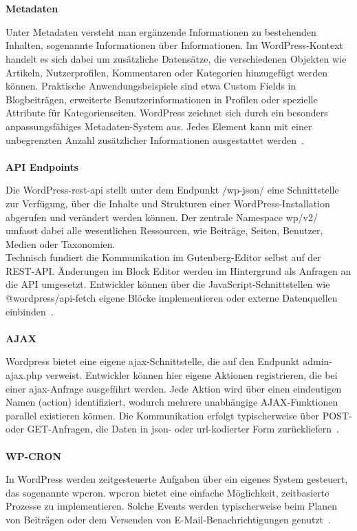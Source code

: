 \\
\\
\textbf{Metadaten}

Unter Metadaten versteht man ergänzende Informationen zu bestehenden Inhalten, sogenannte \grqq{}Informationen über Informationen\grqq{}.
Im WordPress-Kontext handelt es sich dabei um zusätzliche Datensätze, die verschiedenen Objekten wie Artikeln, Nutzerprofilen, Kommentaren oder Kategorien hinzugefügt werden können.
Praktische Anwendungsbeispiele sind etwa Custom Fields in Blogbeiträgen, erweiterte Benutzerinformationen in Profilen oder spezielle Attribute für Kategorienseiten.
WordPress zeichnet sich durch ein besonders anpassungsfähiges Metadaten-System aus.
Jedes Element kann mit einer unbegrenzten Anzahl zusätzlicher Informationen ausgestattet werden~\cite{wordpress2024metadata}.
\\
\\
\textbf{API Endpoints}

Die WordPress-\gls{rest}-\gls{api} stellt unter dem Endpunkt /wp-json/ eine Schnittstelle zur Verfügung, über die Inhalte und Strukturen einer WordPress-Installation abgerufen und verändert werden können.
Der zentrale Namespace wp/v2/ umfasst dabei alle wesentlichen Ressourcen, wie Beiträge, Seiten, Benutzer, Medien oder Taxonomien.
\\
Technisch fundiert die Kommunikation im Gutenberg-Editor selbst auf der REST-API.
Änderungen im Block Editor werden im Hintergrund als Anfragen an die API umgesetzt.
Entwickler können über die JavaScript-Schnittstellen wie @wordpress/api-fetch eigene Blöcke implementieren oder externe Datenquellen einbinden~\cite{wordpress2024restApi}.
\\
\\
\textbf{AJAX}

Wordpress bietet eine eigene \gls{ajax}-Schnittstelle, die auf den Endpunkt admin-ajax.php verweist.
Entwickler können hier eigene Aktionen registrieren, die bei einer \gls{ajax}-Anfrage ausgeführt werden.
Jede Aktion wird über einen eindeutigen Namen (action) identifiziert, wodurch mehrere unabhängige AJAX-Funktionen parallel existieren können.
Die Kommunikation erfolgt typischerweise über POST- oder GET-Anfragen, die Daten in \gls{json}- oder \gls{url}-kodierter Form zurückliefern~\cite{wordpress2024Ajax}.
\\
\\
\textbf{WP-CRON}

In WordPress werden zeitgesteuerte Aufgaben über ein eigenes System gesteuert, das sogenannte \gls{wpcron}.
\gls{wpcron} bietet eine einfache Möglichkeit, zeitbasierte Prozesse zu implementieren.
Solche Events werden typischerweise beim Planen von Beiträgen oder dem Versenden von E-Mail-Benachrichtigungen genutzt~\cite{wordpress2024Cron}.

